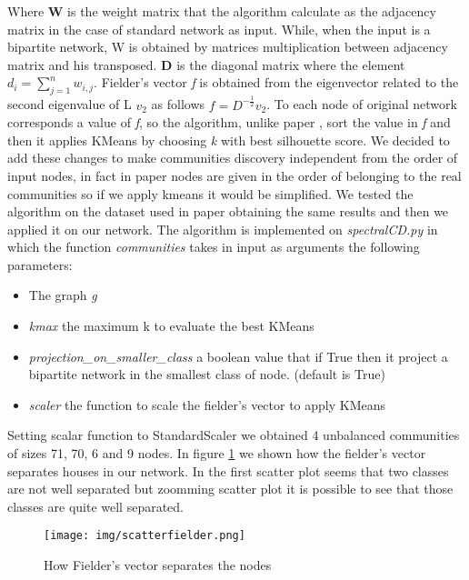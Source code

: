 \documentclass[sigchi]{acmart}
\begin{document}
Where \textbf{W} is the weight matrix that the algorithm calculate as the adjacency matrix in the case of standard network as input. While, when the input is a bipartite network, W is obtained by matrices multiplication between adjacency matrix and his transposed.
\textbf{D} is the diagonal matrix where the element $d_i = \sum_{j=1}^n w_{i,j} $. \newline
Fielder's vector \textit{f} is obtained from the eigenvector related to the second eigenvalue of L $v_2$ as follows $f = D^{-\frac{1}{2}}v_2$. \newline
To each node of original network corresponds  a value of  \textit{f}, so the algorithm, unlike paper \cite{lorem}, sort the value in \textit{f} and then it applies KMeans by choosing \textit{k} with best silhouette score.
We decided to add these changes to make communities discovery independent from the order of input nodes, in fact in paper \cite{lorem} nodes are given in the order of belonging to the real communities so if we apply kmeans it would be simplified.
\newline
We tested the algorithm on the dataset used in paper \cite{lorem} obtaining the same results and then we applied it on our network.
The algorithm is implemented on \textit{spectralCD.py} in which the function \textit{communities} takes in input as arguments the following parameters:
\begin{itemize}
    \item The graph \textit{g}
    \item \textit{kmax} the maximum k to evaluate the best KMeans
    \item \textit{projection\_on\_smaller\_class} a boolean value that if True then it project a bipartite network in the smallest class of node. (default is True)
    \item \textit{scaler} the function to scale the fielder's vector to apply KMeans
\end{itemize}
Setting scalar function to StandardScaler we obtained 4 unbalanced communities of sizes 71, 70, 6 and 9 nodes.
In figure \ref{scat} we shown how the fielder's vector separates houses in our network. In the first scatter plot seems that two classes are not well separated but zoomming scatter plot it is possible to see that those classes are quite well separated. \newline

\begin{figure}[h]
  \centering
  \texttt{[image: img/scatterfielder.png]}
  \caption{How Fielder's vector separates the nodes}
  \label{scat}
\end{figure}
\end{document}
